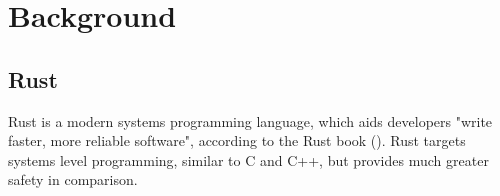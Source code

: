 \documentclass{l4proj}
\begin{document}


%
%
%
%

\chapter{Background}\label{ch:background}

\section{Rust}\label{sec:rust}

Rust is a modern systems programming language, which aids developers "write faster, more reliable software", according
to the Rust book (\cite{kalbnik_rust_nodate}).
Rust targets systems level programming, similar to C and C++, but provides much greater safety in comparison.
\end{document}
